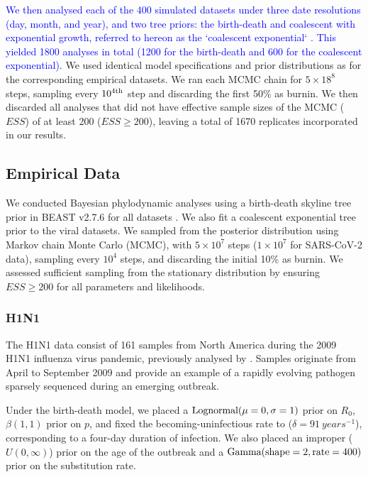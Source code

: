 \documentclass[12pt]{article}
\begin{document}
\begin{spacing}{2}
\textcolor{blue}{We then analysed each of the 400 simulated datasets under three date resolutions (day, month, and year), and two tree priors: the birth-death \citep{stadler2012estimating} and coalescent with exponential growth, referred to hereon as the `coalescent exponential` \citep{kingman_1982_coalescent}. This yielded 1800 analyses in total (1200 for the birth-death and 600 for the coalescent exponential).} We used identical model specifications and prior distributions as for the corresponding empirical datasets. We ran each MCMC chain for $5\times18^{8}$ steps, sampling every $10^{4\textnormal{th}}$ step and discarding the first 50\% as burnin. We then discarded all analyses that did not have effective sample sizes of the MCMC ($ESS$) of at least 200 ($ESS\geq200$), leaving a total of 1670 replicates incorporated in our results.

\subsection*{Empirical Data}
We conducted Bayesian phylodynamic analyses using a birth-death skyline tree prior in BEAST v2.7.6 for all datasets \citep{bouckaert_beast_2019}. We also fit a coalescent exponential tree prior to the viral datasets. We sampled from the posterior distribution using Markov chain Monte Carlo (MCMC), with $5\times10^{7}$ steps ($1\times10^{7}$ for SARS-CoV-2 data), sampling every $10^{4}$ steps, and discarding the initial 10\% as burnin. We assessed sufficient sampling from the stationary distribution by ensuring $ESS\geq200$ for all parameters and likelihoods.

\subsubsection*{H1N1}
The H1N1 data consist of 161 samples from North America during the 2009 H1N1 influenza virus pandemic, previously analysed by \citet{hedge_2013_real-time}. Samples originate from April to September 2009 and provide an example of a rapidly evolving pathogen sparsely sequenced during an emerging outbreak. 

Under the birth-death model, we placed a $\textnormal{Lognormal}(\mu=0,\sigma=1)$ prior on $R_0$, $\beta(1,1)$ prior on $p$, and fixed the becoming-uninfectious rate to ($\delta = 91\ years^{-1}$), corresponding to a four-day duration of infection. We also placed an improper ($U(0,\infty)$) prior on the age of the outbreak and a $\textnormal{Gamma}(\textnormal{shape}=2,\textnormal{rate}=400)$ prior on the substitution rate.


\end{spacing}
\end{document}
